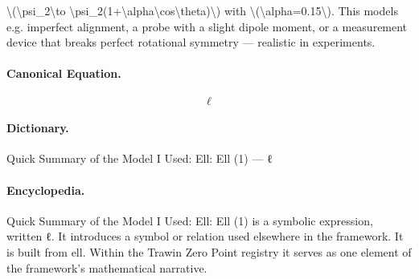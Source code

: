 \textbackslash{}(\textbackslash{}psi\_2\textbackslash{}to \textbackslash{}psi\_2(1+\textbackslash{}alpha\textbackslash{}cos\textbackslash{}theta)\textbackslash{}) with \textbackslash{}(\textbackslash{}alpha=0.15\textbackslash{}). This models e.g. imperfect alignment, a probe with a slight dipole moment, or a measurement device that breaks perfect rotational symmetry — realistic in experiments.

\paragraph{Canonical Equation.}
\[
\ell
\]

\paragraph{Dictionary.}
Quick Summary of the Model I Used: Ell: Ell (1) — ℓ

\paragraph{Encyclopedia.}
Quick Summary of the Model I Used: Ell: Ell (1) is a symbolic expression, written ℓ. It introduces a symbol or relation used elsewhere in the framework. It is built from ell. Within the Trawin Zero Point registry it serves as one element of the framework's mathematical narrative.
